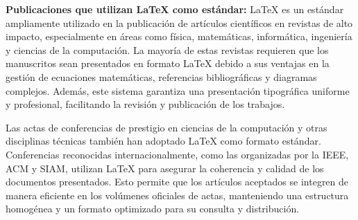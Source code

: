 \documentclass[12pt,twocolumn]{article}
\begin{document}


{\raggedleft \textbf{Publicaciones que utilizan LaTeX como estándar:}}
LaTeX es un estándar ampliamente utilizado en la publicación de artículos científicos en revistas de alto impacto, especialmente en áreas como física, matemáticas, informática, ingeniería y ciencias de la computación. 
La mayoría de estas revistas requieren que los manuscritos sean presentados en formato LaTeX debido a sus ventajas en la gestión de ecuaciones matemáticas, referencias bibliográficas y diagramas complejos. 
Además, este sistema garantiza una presentación tipográfica uniforme y profesional, facilitando la revisión y publicación de los trabajos.

Las actas de conferencias de prestigio en ciencias de la computación y otras disciplinas técnicas también han adoptado LaTeX como formato estándar. 
Conferencias reconocidas internacionalmente, como las organizadas por la IEEE, ACM y SIAM, utilizan LaTeX para asegurar la coherencia y calidad de los documentos presentados. 
Esto permite que los artículos aceptados se integren de manera eficiente en los volúmenes oficiales de actas, manteniendo una estructura homogénea y un formato optimizado para su consulta y distribución.
\end{document}
